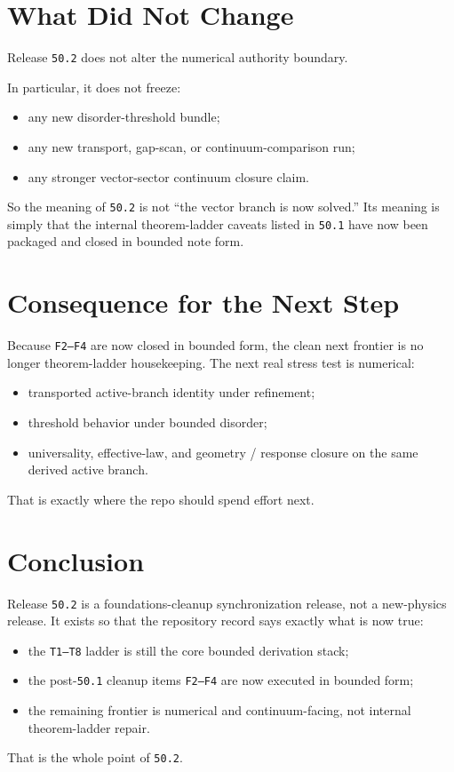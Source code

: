 \documentclass[11pt]{article}
\begin{document}
\section{What Did Not Change}

Release \texttt{50.2} does not alter the numerical authority boundary.

In particular, it does not freeze:
\begin{itemize}
\item any new disorder-threshold bundle;
\item any new transport, gap-scan, or continuum-comparison run;
\item any stronger vector-sector continuum closure claim.
\end{itemize}

So the meaning of \texttt{50.2} is not ``the vector branch is now solved.'' Its meaning is simply that the internal theorem-ladder caveats listed in \texttt{50.1} have now been packaged and closed in bounded note form.

\section{Consequence for the Next Step}

Because \texttt{F2--F4} are now closed in bounded form, the clean next frontier is no longer theorem-ladder housekeeping. The next real stress test is numerical:
\begin{itemize}
\item transported active-branch identity under refinement;
\item threshold behavior under bounded disorder;
\item universality, effective-law, and geometry / response closure on the same derived active branch.
\end{itemize}

That is exactly where the repo should spend effort next.

\section{Conclusion}

Release \texttt{50.2} is a foundations-cleanup synchronization release, not a new-physics release. It exists so that the repository record says exactly what is now true:
\begin{itemize}
\item the \texttt{T1--T8} ladder is still the core bounded derivation stack;
\item the post-\texttt{50.1} cleanup items \texttt{F2--F4} are now executed in bounded form;
\item the remaining frontier is numerical and continuum-facing, not internal theorem-ladder repair.
\end{itemize}

That is the whole point of \texttt{50.2}.
\end{document}
